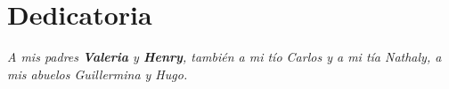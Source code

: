\chapter*{\hfill{\centering Dedicatoria}\hfill}
\normalsize
\justify

\vspace{19cm} %

\begin{flushright} 
\itshape\Large 

\textit{A mis padres \textbf{Valeria} y \textbf{Henry}, también a mi tío Carlos y a mi tía Nathaly, a mis abuelos Guillermina y Hugo.} %

\end{flushright}

